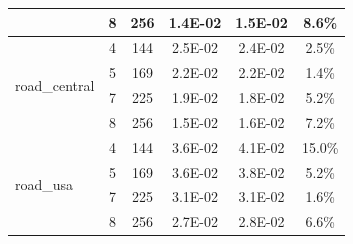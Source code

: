\documentclass[conference, 10ppt]{IEEEtran}
\begin{document}
\begin{table}[htb]
\begin{tabular}[c]{| l | c | c | c | c | c |}
  &  8  &  256  &  1.4E-02  &  1.5E-02  &  8.6\% \\ \hline
\multirow{4}{*}{road\_central}  &  4  &  144  &  2.5E-02  &  2.4E-02  &  2.5\% \\ \cline{2-6}
  &  5  &  169  &  2.2E-02  &  2.2E-02  &  1.4\% \\ \cline{2-6}
  &  7  &  225  &  1.9E-02  &  1.8E-02  &  5.2\% \\ \cline{2-6}
  &  8  &  256  &  1.5E-02  &  1.6E-02  &  7.2\% \\ \hline
\multirow{4}{*}{road\_usa}  &  4  &  144  &  3.6E-02  &  4.1E-02  &  15.0\% \\ \cline{2-6}
  &  5  &  169  &  3.6E-02  &  3.8E-02  &  5.2\% \\ \cline{2-6}
  &  7  &  225  &  3.1E-02  &  3.1E-02  &  1.6\% \\ \cline{2-6}
\  &  8  &  256  &  2.7E-02  &  2.8E-02  &  6.6\% \\ \hline
\end{tabular}
\end{table}
\end{document}
